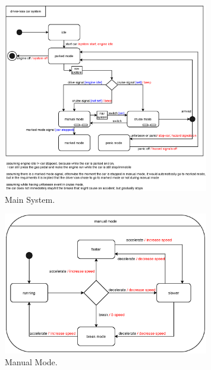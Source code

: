 \documentclass[12pt]{article}
\begin{document}
\begin{spacing}{1.5}
\begin{figure}[h!]
	\centering
		\includegraphics[width=0.8\textwidth]{./A2_Figures/A2_SOEN331_Main.eps}
		  \caption{Main System.}
  \label{fig:main-system-fig}
\end{figure}

\begin{figure}[h!]
	\centering
		\includegraphics[width=0.8\textwidth]{./A2_Figures/A2_SOEN331_Manual.eps}
		  \caption{Manual Mode.}
  \label{fig:manual-mode-fig}
\end{figure}

\end{spacing}
\end{document}
